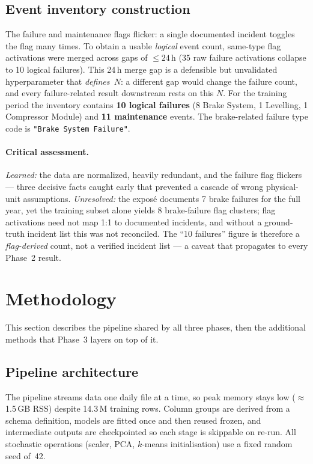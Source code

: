 \documentclass[11pt,a4paper]{article}
\begin{document}
\subsection{Event inventory construction}
\label{sec:events}
The failure and maintenance flags flicker: a single documented incident toggles the flag
many times. To obtain a usable \emph{logical} event count, same-type flag activations
were merged across gaps of $\leq 24$\,h (35 raw failure activations collapse to 10
logical failures). This 24\,h merge gap is a defensible but unvalidated hyperparameter
that \emph{defines~$N$}: a different gap would change the failure count, and every
failure-related result downstream rests on this $N$. For the training period the
inventory contains \textbf{10 logical failures} (8 Brake System, 1 Levelling, 1
Compressor Module) and \textbf{11 maintenance} events. The brake-related failure type
code is \texttt{"Brake System Failure"}.

\paragraph{Critical assessment.}
\emph{Learned:} the data are normalized, heavily redundant, and the failure flag
flickers --- three decisive facts caught early that prevented a cascade of wrong
physical-unit assumptions. \emph{Unresolved:} the exposé documents 7 brake failures for
the full year, yet the training subset alone yields 8 brake-failure flag clusters; flag
activations need not map 1:1 to documented incidents, and without a ground-truth incident
list this was not reconciled. The ``10 failures'' figure is therefore a \emph{flag-derived}
count, not a verified incident list --- a caveat that propagates to every Phase~2 result.

\setcounter{section}{3}
\section{Methodology}
\label{sec:method}

This section describes the pipeline shared by all three phases, then the additional
methods that Phase~3 layers on top of it.

\subsection{Pipeline architecture}
The pipeline streams data one daily file at a time, so peak memory stays low
($\approx$1.5\,GB RSS) despite 14.3\,M training rows. Column groups are derived from a
schema definition, models are fitted once and then reused frozen, and intermediate
outputs are checkpointed so each stage is skippable on re-run. All stochastic operations
(scaler, PCA, $k$-means initialisation) use a fixed random seed of~42.
\end{document}
